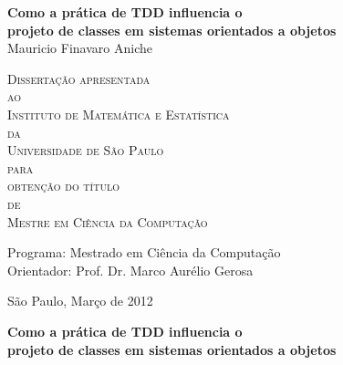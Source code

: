 \documentclass[11pt,openany,twoside,a4paper]{book}
\begin{document}
\frontmatter 
\fancyhead[RO]{{\footnotesize\rightmark}\hspace{2em}\thepage}
\setcounter{tocdepth}{2}
\fancyhead[LE]{\thepage\hspace{2em}\footnotesize{\leftmark}}
\fancyhead[RE,LO]{}
\fancyhead[RO]{{\footnotesize\rightmark}\hspace{2em}\thepage}

\onehalfspacing  %

\thispagestyle{empty}
\begin{center}
    \vspace*{2.3cm}
    \textbf{\Large{Como a prática de TDD influencia o \\projeto de classes em sistemas orientados a objetos}}\\
    
    \vspace*{1.2cm}
    \Large{Mauricio Finavaro Aniche}
    
    \vskip 2cm
    \textsc{
    Dissertação apresentada\\[-0.25cm] 
    ao\\[-0.25cm]
    Instituto de Matemática e Estatística\\[-0.25cm]
    da\\[-0.25cm]
    Universidade de São Paulo\\[-0.25cm]
    para\\[-0.25cm]
    obtenção do título\\[-0.25cm]
    de\\[-0.25cm]
    Mestre em Ciência da Computação}
    
    \vskip 1.5cm
    Programa: Mestrado em Ciência da Computação\\
    Orientador: Prof. Dr. Marco Aurélio Gerosa

   	\vskip 1.5cm
    \normalsize{São Paulo, Março de 2012}
\end{center}

\newpage
\thispagestyle{empty}
    \begin{center}
        \vspace*{2.3 cm}
        \textbf{\Large{Como a prática de TDD influencia o \\projeto de classes em sistemas orientados a objetos}}\\
        \vspace*{2 cm}
    \end{center}
\end{document}
